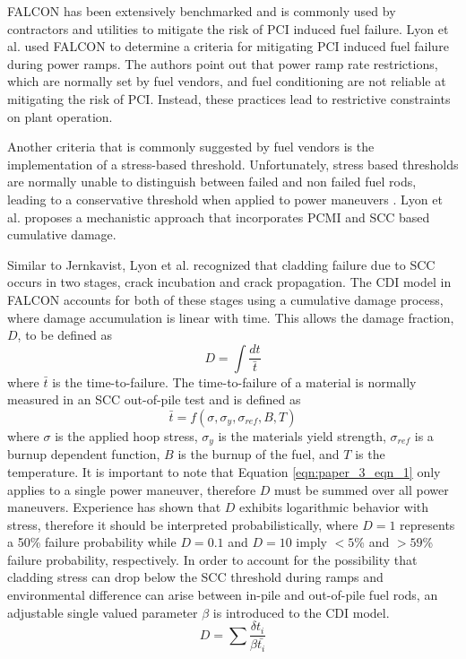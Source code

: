 \documentclass[edeposit,fullpage,11pt]{uiucthesis2009}
\begin{document}
FALCON has been extensively benchmarked and is commonly used by contractors and utilities to mitigate the risk of \gls{PCI} induced fuel failure.
Lyon et al. \cite{lyon_pci_2009} used FALCON  to determine a criteria for mitigating \gls{PCI} induced fuel failure during power ramps.
The authors point out that power ramp rate restrictions, which are normally set by fuel vendors, and fuel conditioning are not reliable at mitigating the risk of \gls{PCI}. 
Instead, these practices lead to restrictive constraints on plant operation.

Another criteria that is commonly suggested by fuel vendors is the implementation of a stress-based threshold.
Unfortunately, stress based thresholds are normally unable to distinguish between failed and non failed fuel rods, leading to a conservative threshold when applied to power maneuvers \cite{lyon_pci_2009}.
 Lyon et al. proposes a mechanistic approach that incorporates \gls{PCMI} and \gls{SCC} based cumulative damage.

Similar to Jernkavist,  Lyon et al. recognized that cladding failure due to \gls{SCC} occurs in two stages, crack incubation and crack propagation.
The \gls{CDI} model in FALCON accounts for both of these stages using a cumulative damage process, where damage accumulation is linear with time.
This allows the damage fraction, $D$, to be defined as 
\begin{equation}\label{eqn:paper_3_eqn_1}
D = \int \frac{dt}{\bar{t}}
\end{equation}
where $\bar{t}$ is the time-to-failure.
The time-to-failure of a material is normally measured in an \gls{SCC} out-of-pile test and is defined as
\begin{equation}
\bar{t} = f(\sigma,\sigma_y,\sigma_{ref},B,T)
\end{equation}
where $\sigma$ is the applied hoop stress, $\sigma_y$ is the materials yield strength, $\sigma_{ref}$ is a burnup dependent function, $B$ is the burnup of the fuel, and $T$ is the temperature.
It is important to note that Equation \ref{eqn:paper_3_eqn_1} only applies to a single power maneuver, therefore $D$ must be summed over all power maneuvers. 
Experience has shown that $D$ exhibits logarithmic behavior with stress, therefore it should be interpreted probabilistically, where $D=1$ represents a 50\% failure probability while $D=0.1$ and $D=10$ imply  $<5$\% and $>59$\% failure probability, respectively.
In order to account for the possibility that cladding stress can drop below the \gls{SCC} threshold during ramps and environmental difference can arise between in-pile and out-of-pile fuel rods, an adjustable single valued parameter $\beta$ is introduced to the \gls{CDI} model. 
\begin{equation}
D = \sum \frac{\delta t_i}{\beta \bar{t_i}}
\end{equation}
\end{document}
